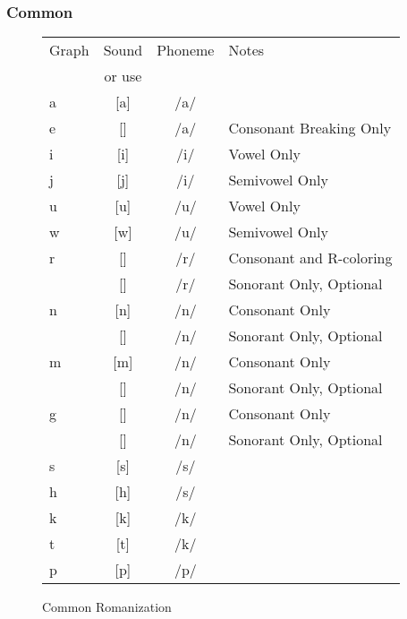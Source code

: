 \documentclass[11pt,letterpaper]{article}
\makeatletter
\newcommand{\epsi}{\textipa{E}}
\newcommand{\engma}{\textipa{N}}
\newcommand{\rson}{\textipa{@}\textrhoticity}
\newcommand{\flap}{\textipa{R}}
\newcommand{\nson}{\s{n}}
\newcommand{\mson}{\s{m}}
\newcommand{\engson}{\s{\engma}}
\makeatother
\begin{document}
		\subsubsection{Common}
		\begin{wrapfigure}{l}{0.575\textwidth}
  			\begin{tabular}{|l|c|c|l|}
  				\hline
  				Graph      & Sound     & Phoneme & Notes\\
  				           & or use    &         &      \\ \hline \hline
  				\textlangle{}a\textrangle{}        & [a]       & /a/     &      \\
  				\textlangle{}e\textrangle{}        & [\epsi]   & /a/     & Consonant Breaking Only \\
  				\textlangle{}i\textrangle{}        & [i]       & /i/     & Vowel Only \\
  				\textlangle{}j\textrangle{}        & [j]       & /i/     & Semivowel Only \\
  				\textlangle{}u\textrangle{}        & [u]       & /u/     & Vowel Only \\
  				\textlangle{}w\textrangle{}        & [w]       & /u/     & Semivowel Only \\
  				\textlangle{}r\textrangle{}        & [\flap]   & /r/     & Consonant and R-coloring \\
  				\textlangle{}\s{r}\textrangle{}    & [\rson]   & /r/     & Sonorant Only, Optional \\
				\textlangle{}n\textrangle{}        & [n]       & /n/     & Consonant Only \\
				\textlangle{}\nson\textrangle{}    & [\nson]   & /n/     & Sonorant Only, Optional \\ 
				\textlangle{}m\textrangle{}        & [m]       & /n/     & Consonant Only \\
				\textlangle{}\mson\textrangle{}    & [\mson]   & /n/     & Sonorant Only, Optional \\ 				
				\textlangle{}g\textrangle{}        & [\engma]  & /n/     & Consonant Only \\
				\textlangle{}\s{g}\textrangle{}    & [\engson] & /n/     & Sonorant Only, Optional \\
				\textlangle{}s\textrangle{}        & [s]       & /s/     &   \\
				\textlangle{}h\textrangle{}        & [h]       & /s/     &   \\
				\textlangle{}k\textrangle{}        & [k]       & /k/     &   \\
				\textlangle{}t\textrangle{}        & [t]       & /k/     &   \\ 
  				\textlangle{}p\textrangle{}        & [p]       & /p/     &   \\ \hline        
  			\end{tabular}
  			\caption{Common Romanization}
		\end{wrapfigure}
\end{document}
